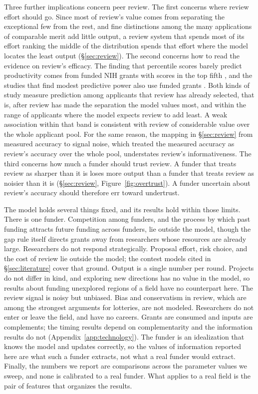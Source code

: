 \documentclass[article, 11pt, reqno]{amsart}
\theoremstyle{named}
\begin{document}
Three further implications concern peer review. The first concerns where review effort should go. Since most of review's value comes from separating the exceptional few from the rest, and fine distinctions among the many applications of comparable merit add little output, a review system that spends most of its effort ranking the middle of the distribution spends that effort where the model locates the least output (\S\ref{sec:review}). The second concerns how to read the evidence on review's efficacy. The finding that percentile scores barely predict productivity comes from funded NIH grants with scores in the top fifth \citep{Fang2016}, and the studies that find modest predictive power also use funded grants \citep{LiAgha2015}. Both kinds of study measure prediction among applicants that review has already selected, that is, after review has made the separation the model values most, and within the range of applicants where the model expects review to add least. A weak association within that band is consistent with review of considerable value over the whole applicant pool. For the same reason, the mapping in \S\ref{sec:review} from measured accuracy to signal noise, which treated the measured accuracy as review's accuracy over the whole pool, understates review's informativeness. The third concerns how much a funder should trust review. A funder that treats review as sharper than it is loses more output than a funder that treats review as noisier than it is (\S\ref{sec:review}, Figure~\ref{fig:overtrust}). A funder uncertain about review's accuracy should therefore err toward undertrust.

The model holds several things fixed, and its results hold within those limits. There is one funder. Competition among funders, and the process by which past funding attracts future funding across funders, lie outside the model, though the gap rule itself directs grants away from researchers whose resources are already large. Researchers do not respond strategically. Proposal effort, risk choice, and the cost of review lie outside the model; the contest models cited in \S\ref{sec:literature} cover that ground. Output is a single number per round. Projects do not differ in kind, and exploring new directions has no value in the model, so results about funding unexplored regions of a field have no counterpart here. The review signal is noisy but unbiased. Bias and conservatism in review, which are among the strongest arguments for lotteries, are not modeled. Researchers do not enter or leave the field, and have no careers. Grants are consumed and inputs are complements; the timing results depend on complementarity and the information results do not (Appendix~\ref{app:technology}). The funder is an idealization that knows the model and updates correctly, so the values of information reported here are what such a funder extracts, not what a real funder would extract. Finally, the numbers we report are comparisons across the parameter values we sweep, and none is calibrated to a real funder. What applies to a real field is the pair of features that organizes the results.
\end{document}
